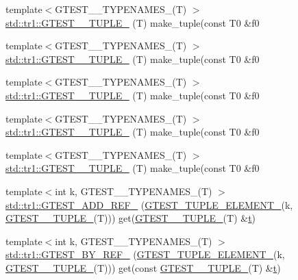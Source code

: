 \begin{DoxyCompactItemize}
{\footnotesize template$<$G\+T\+E\+S\+T\+\_\+\_\+\+T\+Y\+P\+E\+N\+A\+M\+E\+S\+\_\+(\+T) $>$ }\\\mbox{\hyperlink{namespacestd_1_1tr1_a31cde155977a4544af2b44b51ffe69ac}{std\+::tr1\+::\+G\+T\+E\+S\+T\+\_\+\_\+\+T\+U\+P\+L\+E\+\_\+}} (T) make\+\_\+tuple(const T0 \&f0
\item 
{\footnotesize template$<$G\+T\+E\+S\+T\+\_\+\_\+\+T\+Y\+P\+E\+N\+A\+M\+E\+S\+\_\+(\+T) $>$ }\\\mbox{\hyperlink{namespacestd_1_1tr1_a61277f5af24b20fce87a9fd94307ab34}{std\+::tr1\+::\+G\+T\+E\+S\+T\+\_\+\_\+\+T\+U\+P\+L\+E\+\_\+}} (T) make\+\_\+tuple(const T0 \&f0
\item 
{\footnotesize template$<$G\+T\+E\+S\+T\+\_\+\_\+\+T\+Y\+P\+E\+N\+A\+M\+E\+S\+\_\+(\+T) $>$ }\\\mbox{\hyperlink{namespacestd_1_1tr1_a29c8efcb79a4749e079b704c418266e6}{std\+::tr1\+::\+G\+T\+E\+S\+T\+\_\+\_\+\+T\+U\+P\+L\+E\+\_\+}} (T) make\+\_\+tuple(const T0 \&f0
\item 
{\footnotesize template$<$G\+T\+E\+S\+T\+\_\+\_\+\+T\+Y\+P\+E\+N\+A\+M\+E\+S\+\_\+(\+T) $>$ }\\\mbox{\hyperlink{namespacestd_1_1tr1_a6afad1f98814ccc897d0b02bc6fc4e7d}{std\+::tr1\+::\+G\+T\+E\+S\+T\+\_\+\_\+\+T\+U\+P\+L\+E\+\_\+}} (T) make\+\_\+tuple(const T0 \&f0
\item 
{\footnotesize template$<$G\+T\+E\+S\+T\+\_\+\_\+\+T\+Y\+P\+E\+N\+A\+M\+E\+S\+\_\+(\+T) $>$ }\\\mbox{\hyperlink{namespacestd_1_1tr1_aa636d3269bf1f368a7bc09ff158bc482}{std\+::tr1\+::\+G\+T\+E\+S\+T\+\_\+\_\+\+T\+U\+P\+L\+E\+\_\+}} (T) make\+\_\+tuple(const T0 \&f0
\item 
{\footnotesize template$<$int k, G\+T\+E\+S\+T\+\_\+\_\+\+T\+Y\+P\+E\+N\+A\+M\+E\+S\+\_\+(\+T) $>$ }\\\mbox{\hyperlink{namespacestd_1_1tr1_a495d7fb7a131317a9ba985598d3c1504}{std\+::tr1\+::\+G\+T\+E\+S\+T\+\_\+\+A\+D\+D\+\_\+\+R\+E\+F\+\_\+}} (\mbox{\hyperlink{gtest-tuple_8h_a1b7f133d8aa02e0b7afed7b66781eeb7}{G\+T\+E\+S\+T\+\_\+\+T\+U\+P\+L\+E\+\_\+\+E\+L\+E\+M\+E\+N\+T\+\_\+}}(k, \mbox{\hyperlink{gtest-tuple_8h_a275e7bcd84299cc44b9c1dba971951c4}{G\+T\+E\+S\+T\+\_\+\_\+\+T\+U\+P\+L\+E\+\_\+}}(T))) get(\mbox{\hyperlink{gtest-tuple_8h_a275e7bcd84299cc44b9c1dba971951c4}{G\+T\+E\+S\+T\+\_\+\_\+\+T\+U\+P\+L\+E\+\_\+}}(T) \&\mbox{\hyperlink{_mutual_8h_a978d88b393c8a37dc2614c88788b3442}{t}})
\item 
{\footnotesize template$<$int k, G\+T\+E\+S\+T\+\_\+\_\+\+T\+Y\+P\+E\+N\+A\+M\+E\+S\+\_\+(\+T) $>$ }\\\mbox{\hyperlink{namespacestd_1_1tr1_ae7b5ea477ac34a3eef5c4c15c42b76ed}{std\+::tr1\+::\+G\+T\+E\+S\+T\+\_\+\+B\+Y\+\_\+\+R\+E\+F\+\_\+}} (\mbox{\hyperlink{gtest-tuple_8h_a1b7f133d8aa02e0b7afed7b66781eeb7}{G\+T\+E\+S\+T\+\_\+\+T\+U\+P\+L\+E\+\_\+\+E\+L\+E\+M\+E\+N\+T\+\_\+}}(k, \mbox{\hyperlink{gtest-tuple_8h_a275e7bcd84299cc44b9c1dba971951c4}{G\+T\+E\+S\+T\+\_\+\_\+\+T\+U\+P\+L\+E\+\_\+}}(T))) get(const \mbox{\hyperlink{gtest-tuple_8h_a275e7bcd84299cc44b9c1dba971951c4}{G\+T\+E\+S\+T\+\_\+\_\+\+T\+U\+P\+L\+E\+\_\+}}(T) \&\mbox{\hyperlink{_mutual_8h_a978d88b393c8a37dc2614c88788b3442}{t}})

\end{DoxyCompactItemize}
